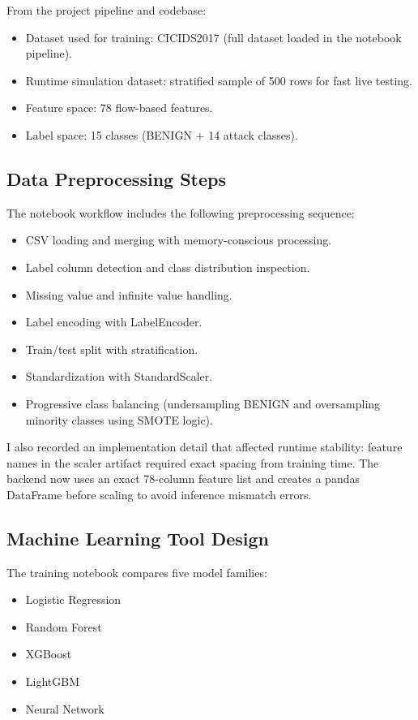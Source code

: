 \documentclass[12pt,a4paper]{article}
\begin{document}
From the project pipeline and codebase:
\begin{itemize}
\item Dataset used for training: CICIDS2017 (full dataset loaded in the notebook pipeline).
\item Runtime simulation dataset: stratified sample of 500 rows for fast live testing.
\item Feature space: 78 flow-based features.
\item Label space: 15 classes (BENIGN + 14 attack classes).
\end{itemize}

\subsection{Data Preprocessing Steps}
The notebook workflow includes the following preprocessing sequence:
\begin{itemize}
\item CSV loading and merging with memory-conscious processing.
\item Label column detection and class distribution inspection.
\item Missing value and infinite value handling.
\item Label encoding with LabelEncoder.
\item Train/test split with stratification.
\item Standardization with StandardScaler.
\item Progressive class balancing (undersampling BENIGN and oversampling minority classes using SMOTE logic).
\end{itemize}

I also recorded an implementation detail that affected runtime stability: feature names in the scaler artifact required exact spacing from training time. The backend now uses an exact 78-column feature list and creates a pandas DataFrame before scaling to avoid inference mismatch errors.

\subsection{Machine Learning Tool Design}
The training notebook compares five model families:
\begin{itemize}
\item Logistic Regression
\item Random Forest
\item XGBoost
\item LightGBM
\item Neural Network
\end{itemize}
\end{document}
